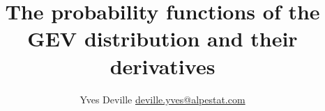 \documentclass[10pt]{article}
\title{The probability functions of the GEV distribution
  and their derivatives}
\author{Yves Deville \href{mailto:deville.yves@alpestat.com}%
  {deville.yves@alpestat.com} }
\begin{document}
\maketitle{}
\tableofcontents


\end{document}

